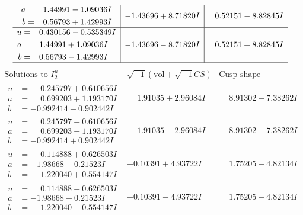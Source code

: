 \documentclass[1p]{elsarticle_modified}
\theoremstyle{definition}
\newcommand{\I}{\sqrt{-1}}
\begin{document}
$$\begin{array}{c|c|c}
\begin{aligned}
a &= \phantom{-}1.44991 - 1.09036 I \\
b &= \phantom{-}0.56793 + 1.42993 I\end{aligned}
 & -1.43696 + 8.71820 I & \phantom{-}0.52151 - 8.82845 I \\ \hline\begin{aligned}
u &= \phantom{-}0.430156 - 0.535349 I \\
a &= \phantom{-}1.44991 + 1.09036 I \\
b &= \phantom{-}0.56793 - 1.42993 I\end{aligned}
 & -1.43696 - 8.71820 I & \phantom{-}0.52151 + 8.82845 I\\
 \hline 
 \end{array}$$\newpage$$\begin{array}{c|c|c}  
\text{Solutions to }I^u_{2}& \I (\text{vol} + \sqrt{-1}CS) & \text{Cusp shape}\\
 \hline 
\begin{aligned}
u &= \phantom{-}0.245797 + 0.610656 I \\
a &= \phantom{-}0.699203 + 1.193170 I \\
b &= -0.992414 - 0.902442 I\end{aligned}
 & \phantom{-}1.91035 + 2.96084 I & \phantom{-}8.91302 - 7.38262 I \\ \hline\begin{aligned}
u &= \phantom{-}0.245797 - 0.610656 I \\
a &= \phantom{-}0.699203 - 1.193170 I \\
b &= -0.992414 + 0.902442 I\end{aligned}
 & \phantom{-}1.91035 - 2.96084 I & \phantom{-}8.91302 + 7.38262 I \\ \hline\begin{aligned}
u &= \phantom{-}0.114888 + 0.626503 I \\
a &= -1.98668 + 0.21523 I \\
b &= \phantom{-}1.220040 + 0.554147 I\end{aligned}
 & -0.10391 + 4.93722 I & \phantom{-}1.75205 - 4.82134 I \\ \hline\begin{aligned}
u &= \phantom{-}0.114888 - 0.626503 I \\
a &= -1.98668 - 0.21523 I \\
b &= \phantom{-}1.220040 - 0.554147 I\end{aligned}
 & -0.10391 - 4.93722 I & \phantom{-}1.75205 + 4.82134 I \\ \hline\begin{aligned}

\end{aligned}
\end{array}$$
\end{document}
